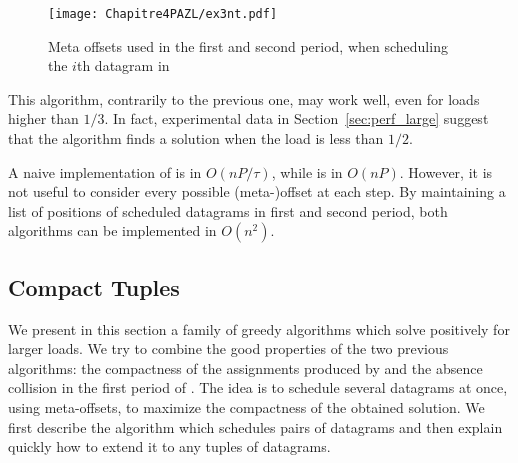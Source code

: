      \begin{figure}
      \begin{center}
      \texttt{[image: Chapitre4PAZL/ex3nt.pdf]}
      \end{center}
      \caption{Meta offsets used in the first and second period, when scheduling the $i$th datagram in \metaoffset}
      \label{fig:metaoffset}
      \end{figure}

  
This algorithm, contrarily to the previous one, may work well, even for loads higher than $1/3$.
In fact, experimental data in Section~\ref{sec:perf_large} suggest that the algorithm finds a solution when the load is less than $1/2$.




A naive implementation of \metaoffset is in $O(n P/\tau)$, while \firstfit is in $O(nP)$.
However, it is not useful to consider every possible (meta-)offset at each step. By maintaining
a list of positions of scheduled datagrams in first and second period, both algorithms can be implemented in $O(n^2)$.


\subsection{Compact Tuples}\label{sec:compacttuple}

We present in this section a family of greedy algorithms which solve \pma positively for larger loads. We try to combine the good properties of the two previous algorithms: the compactness of the assignments produced by \firstfit and the absence collision in the first period of \metaoffset. The idea is to schedule several datagrams at once, using meta-offsets, to maximize the compactness of the obtained solution. We first describe the algorithm which schedules pairs of datagrams and then explain quickly how to extend it to any tuples of datagrams.


